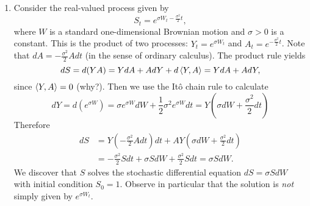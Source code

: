 \begin{example}
\begin{enumerate}[\upshape (i)]
    \item Consider the real-valued process given by
    \begin{equation*}
        S_t = e^{\sigma W_t-\frac{\sigma^2}{2}t},
    \end{equation*}
    where $W$ is a standard one-dimensional Brownian motion and $\sigma>0$ is a constant. This is the product of two processes: $Y_t = e^{\sigma W_t}$ and $A_t=e^{-\frac{\sigma^2}{2}t}$. Note that $dA = -\frac{\sigma^2}{2}A dt$ (in the sense of ordinary calculus). The product rule yields
    \begin{equation*}
        dS = d(YA) = YdA + AdY + d\braket{Y,A} = YdA + AdY,
    \end{equation*}
    since $\braket{Y,A}=0$ (why?). Then we use the It\^{o} chain rule to calculate
    \begin{equation*}
        dY = d(e^{\sigma W}) = \sigma e^{\sigma W}dW + \frac{1}{2}\sigma^2 e^{\sigma W}dt = Y\left(\sigma dW + \frac{\sigma^2}{2}dt\right)
    \end{equation*}
    Therefore
    \begin{align*}
        dS &= Y\left(-\frac{\sigma^2}{2}A dt\right)dt + AY\left(\sigma dW+\frac{\sigma^2}{2}dt\right) \\
        &= -\frac{\sigma^2}{2}Sdt + \sigma SdW + \frac{\sigma^2}{2}Sdt = \sigma SdW.
    \end{align*}
    We discover that $S$ solves the stochastic differential equation $dS = \sigma SdW$ with initial condition $S_0=1$. Observe in particular that the solution is \emph{not} simply given by $e^{\sigma W_t}$.


\end{enumerate}
\end{example}
